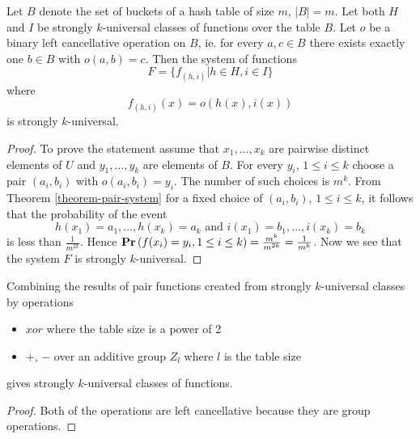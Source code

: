 \begin{theorem}
Let $B$ denote the set of buckets of a hash table of size $m$, $|B| = m$. Let both $H$ and $I$ be strongly $k$-universal classes of functions over the table $B$. Let $o$ be a binary left cancellative operation on $B$, ie. for every $a, c \in B$ there exists exactly one $b \in B$ with $o(a, b) = c$. Then the system of functions \[F = \lbrace f_{(h, i)} | h \in H, i \in I \rbrace\] where \[f_{(h, i)}(x) = o(h(x), i(x))\] is strongly $k$-universal.
\end{theorem}
\begin{proof}
To prove the statement assume that $x_1, \dots, x_k$ are pairwise distinct elements of $U$ and $y_1, \dots, y_k$ are elements of $B$. For every $y_i$, $1 \leq i \leq k$ choose a pair $(a_i, b_i)$ with $o(a_i, b_i)=y_i$. The number of such choices is $m ^k$. From Theorem \ref{theorem-pair-system} for a fixed choice of $(a_i, b_i)$, $1 \leq i \leq k$, it follows that the probability of the event \[ h(x_1) = a_1, \dots, h(x_k) = a_k \text{ and } i(x_1) = b_1, \dots, i(x_k) = b_k \] is less than $\frac{1}{m^{2k}}$. Hence $\mathbf{Pr}\left(f(x_i\right) = y_i, 1 \le i \le k) = \frac{m^k}{m^{2k}} = \frac{1}{m^k}$. Now we see that the system $F$ is strongly $k$-universal.
\end{proof}

\begin{corollary}
Combining the results of pair functions created from strongly $k$-universal classes by operations
\begin{itemize}
\item $xor$ where the table size is a power of 2
\item $+$, $-$ over an additive group $Z_l$ where $l$ is the table size
\end{itemize}
gives strongly $k$-universal classes of functions.
\end{corollary}
\begin{proof}
Both of the operations are left cancellative because they are group operations.
\end{proof}

